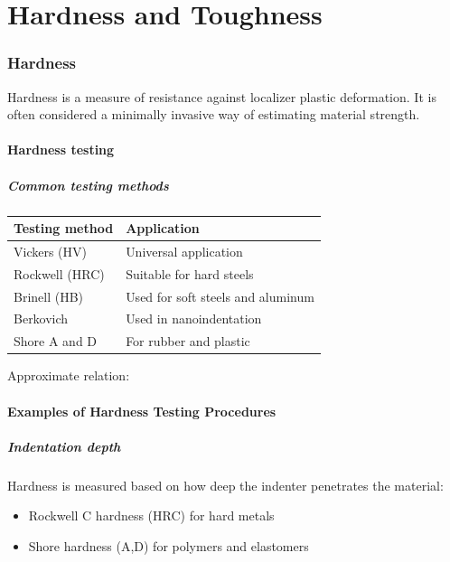\documentclass{article}
\begin{document}
\newpage
\part{Hardness and Toughness}
\section{Hardness}
Hardness is a measure of resistance against localizer plastic deformation. It is often
considered a minimally invasive way of estimating material strength.

\subsection{Hardness testing}
\subsubsection{Common testing methods}
\begin{table}[h!]
  \centering
  \begin{tabular}{|l|l|}
    \hline
    \textbf{Testing method} & \textbf{Application}\\
    \hline
    Vickers (HV) & Universal application\\
    \hline
    Rockwell (HRC) & Suitable for hard steels\\
    \hline
    Brinell (HB) & Used for soft steels and aluminum\\
    \hline
    Berkovich & Used in nanoindentation\\
    \hline
    Shore A and D & For rubber and plastic\\
    \hline
  \end{tabular}
\end{table}
\vspace*{.5cm}
Approximate relation:

\subsection{Examples of Hardness Testing Procedures}
\subsubsection{Indentation depth}
Hardness is measured based on how deep the indenter penetrates the material: 
\begin{itemize}
  \item Rockwell C hardness (HRC) for hard metals
  \item Shore hardness (A,D) for polymers and elastomers
\end{itemize}
\end{document}
